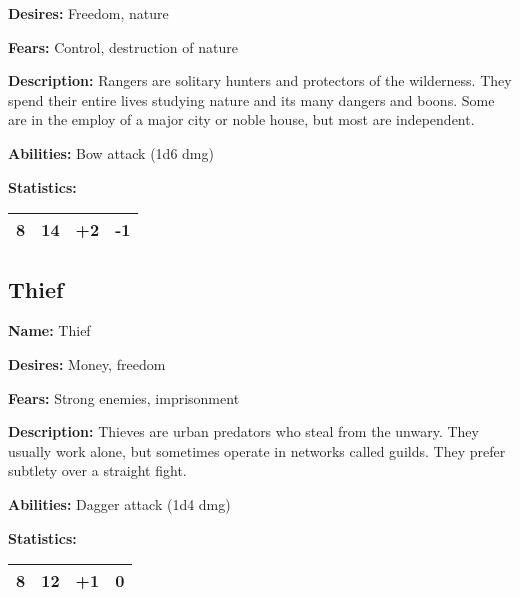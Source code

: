 \begin{multicols}{2}
\textbf{Desires:} Freedom, nature

\textbf{Fears:} Control, destruction of nature

\textbf{Description:} Rangers are solitary hunters and protectors of the wilderness. They
spend their entire lives studying nature and its many dangers and boons. Some are in the
employ of a major city or noble house, but most are independent.

\textbf{Abilities:} Bow attack (1d6 dmg)

\textbf{Statistics:}

\begin{center}
{
\begin{xtabular}{|l|l|l|l|}
8 & 14 & +2 & -1 \\
\hline
\end{xtabular}
}
\end{center}

\subsection{Thief}

\textbf{Name:} Thief

\textbf{Desires:} Money, freedom

\textbf{Fears:} Strong enemies, imprisonment

\textbf{Description:} Thieves are urban predators who steal from the unwary. They
usually work alone, but sometimes operate in networks called guilds. They prefer
subtlety over a straight fight.

\textbf{Abilities:} Dagger attack (1d4 dmg)

\textbf{Statistics:}

\begin{center}
{
\begin{xtabular}{|l|l|l|l|}
8 & 12 & +1 & 0 \\
\hline
\end{xtabular}
}
\end{center}


\end{multicols}
